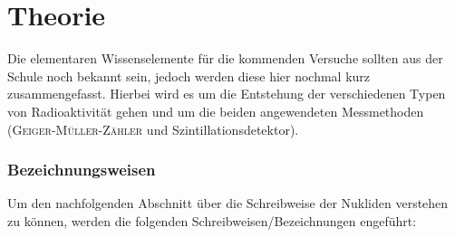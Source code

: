 \documentclass[../protokoll.tex]{subfiles}
\begin{document}
\part{Theorie}
Die elementaren Wissenselemente für die kommenden Versuche sollten aus der
Schule noch bekannt sein, jedoch werden diese hier nochmal kurz zusammengefasst.
Hierbei wird es um die Entstehung der verschiedenen Typen von Radioaktivität
gehen und um die beiden angewendeten Messmethoden 
(\textsc{Geiger-Müller-Zähler} und Szintillationsdetektor).

\section{Bezeichnungsweisen}
Um den nachfolgenden Abschnitt über die Schreibweise der Nukliden verstehen zu 
können, werden die folgenden Schreibweisen/Bezeichnungen engeführt:
\end{document}
